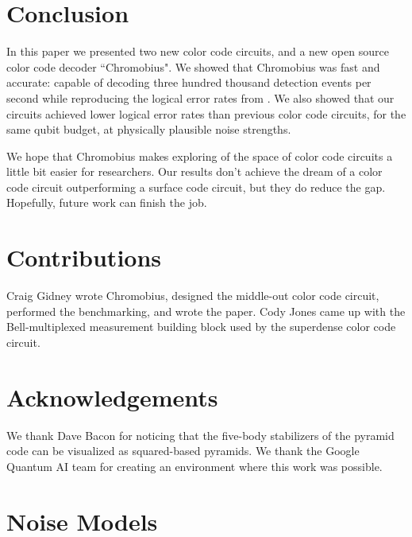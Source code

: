 \documentclass[onecolumn,unpublished,a4paper]{quantumarticle}
\theoremstyle{definition}
\theoremstyle{definition}
\theoremstyle{definition}
\begin{document}
\section{Conclusion}
\label{sec:conclusion}

In this paper we presented two new color code circuits, and a new open source color code decoder ``Chromobius".
We showed that Chromobius was fast and accurate: capable of decoding three hundred thousand detection events per second while reproducing the logical error rates from \cite{sahay2022mobiusdecoder}.
We also showed that our circuits achieved lower logical error rates than previous color code circuits, for the same qubit budget, at physically plausible noise strengths.

We hope that Chromobius makes exploring of the space of color code circuits a little bit easier for researchers.
Our results don't achieve the dream of a color code circuit outperforming a surface code circuit, but they do reduce the gap.
Hopefully, future work can finish the job.


\section{Contributions}

Craig Gidney wrote Chromobius, designed the middle-out color code circuit, performed the benchmarking, and wrote the paper.
Cody Jones came up with the Bell-multiplexed measurement building block used by the superdense color code circuit.

\section{Acknowledgements}
We thank Dave Bacon for noticing that the five-body stabilizers of the pyramid code can be visualized as squared-based pyramids.
We thank the Google Quantum AI team for creating an environment where this work was possible.

\printbibliography

\appendix

\clearpage
\section{Noise Models}
\label{app:noise-models}
\end{document}
